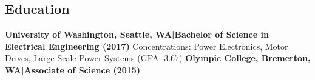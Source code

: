 \documentclass[]{article}
\begin{document}
\begin{singlespace}
\section*{Education}

\textbf{University of Washington, Seattle, WA\hspace{3 mm}|\hspace{3 mm}Bachelor of Science in Electrical Engineering (2017)}
\newline Concentrations: Power Electronics, Motor Drives, Large-Scale Power Systems (GPA: 3.67)
\vspace{-3mm}
\newline\break\textbf{Olympic College, Bremerton, WA\hspace{3 mm}|\hspace{3 mm}Associate of Science (2015)}

\end{singlespace}
\end{document}
